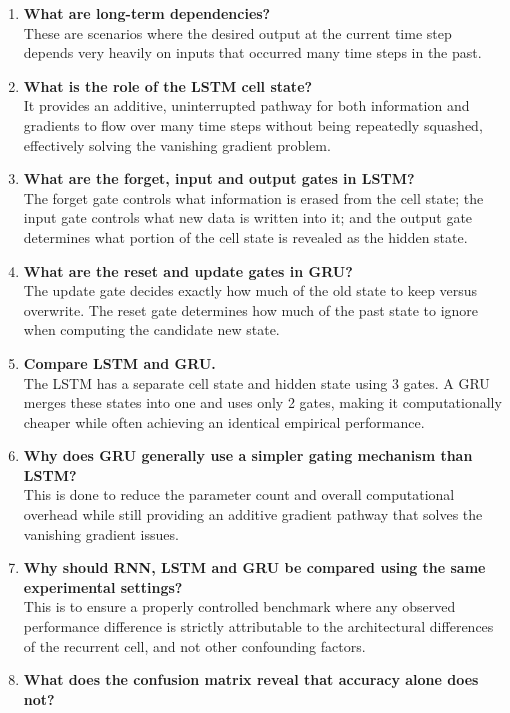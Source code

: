 \documentclass[10pt]{article}
\begin{document}
\begin{enumerate}[itemsep=0.15cm]
    \item {\small \textbf{What are long-term dependencies?}} \\[0.1cm]
These are scenarios where the desired output at the current time step depends very heavily on inputs that occurred many time steps in the past.
    \item {\small \textbf{What is the role of the LSTM cell state?}} \\[0.1cm]
It provides an additive, uninterrupted pathway for both information and gradients to flow over many time steps without being repeatedly squashed, effectively solving the vanishing gradient problem.
    \item {\small \textbf{What are the forget, input and output gates in LSTM?}} \\[0.1cm]
The forget gate controls what information is erased from the cell state; the input gate controls what new data is written into it; and the output gate determines what portion of the cell state is revealed as the hidden state.
    \item {\small \textbf{What are the reset and update gates in GRU?}} \\[0.1cm]
The update gate decides exactly how much of the old state to keep versus overwrite. The reset gate determines how much of the past state to ignore when computing the candidate new state.
    \item {\small \textbf{Compare LSTM and GRU.}} \\[0.1cm]
The LSTM has a separate cell state and hidden state using 3 gates. A GRU merges these states into one and uses only 2 gates, making it computationally cheaper while often achieving an identical empirical performance.
    \item {\small \textbf{Why does GRU generally use a simpler gating mechanism than LSTM?}} \\[0.1cm]
This is done to reduce the parameter count and overall computational overhead while still providing an additive gradient pathway that solves the vanishing gradient issues.
    \item {\small \textbf{Why should RNN, LSTM and GRU be compared using the same experimental settings?}} \\[0.1cm]
This is to ensure a properly controlled benchmark where any observed performance difference is strictly attributable to the architectural differences of the recurrent cell, and not other confounding factors.
    \item {\small \textbf{What does the confusion matrix reveal that accuracy alone does not?}} \\[0.1cm]

\end{enumerate}
\end{document}
